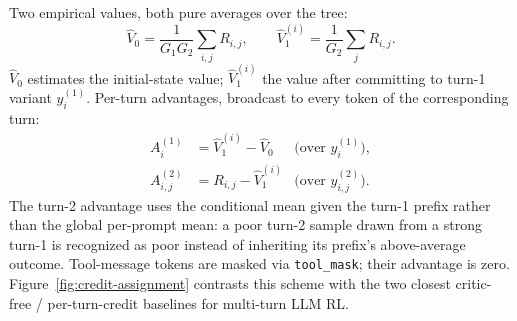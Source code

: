 \documentclass[11pt,a4paper]{article}
\begin{document}
Two empirical values, both pure averages over the tree:
\begin{equation}
  \widehat V_0 = \frac{1}{G_1 G_2}\sum_{i,j} R_{i,j},
  \qquad
  \widehat V_1^{(i)} = \frac{1}{G_2}\sum_{j} R_{i,j}.
\end{equation}
$\widehat V_0$ estimates the initial-state value;
$\widehat V_1^{(i)}$ the value after committing to turn-1 variant
$y^{(1)}_i$. Per-turn advantages, broadcast to every token of the
corresponding turn:
\begin{align}
  A^{(1)}_{i}      &= \widehat V_1^{(i)} - \widehat V_0
    & \text{(over $y^{(1)}_i$)}, \label{eq:adv1}\\
  A^{(2)}_{i,j}    &= R_{i,j} - \widehat V_1^{(i)}
    & \text{(over $y^{(2)}_{i,j}$).} \label{eq:adv2}
\end{align}
The turn-2 advantage uses the conditional mean given the turn-1
prefix rather than the global per-prompt mean: a poor turn-2 sample
drawn from a strong turn-1 is recognized as poor instead of
inheriting its prefix's above-average outcome. Tool-message tokens
are masked via \texttt{tool\_mask}; their advantage is zero.
Figure~\ref{fig:credit-assignment} contrasts this scheme with the
two closest critic-free / per-turn-credit baselines for multi-turn
LLM RL.
\end{document}
